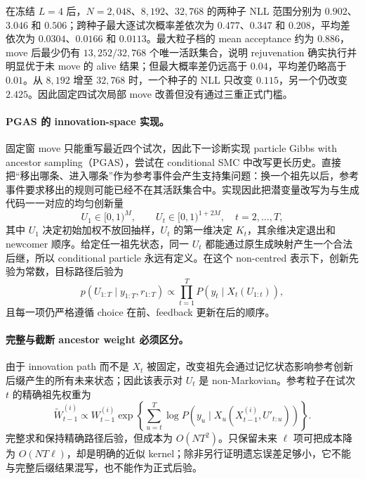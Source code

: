 在冻结 $L=4$ 后，$N=2{,}048$、$8{,}192$、$32{,}768$ 的两种子 NLL 范围分别为 $0.902$、$3.046$ 和 $0.506$；跨种子最大逐试次概率差依次为 $0.477$、$0.347$ 和 $0.208$，平均差依次为 $0.0304$、$0.0166$ 和 $0.0113$。最大粒子档的 mean acceptance 约为 $0.886$，move 后最少仍有 $13{,}252/32{,}768$ 个唯一活跃集合，说明 rejuvenation 确实执行并明显优于未 move 的 alive 结果；但最大概率差仍远高于 $0.04$，平均差仍略高于 $0.01$。从 $8{,}192$ 增至 $32{,}768$ 时，一个种子的 NLL 只改变 $0.115$，另一个仍改变 $2.425$。因此固定四试次局部 move 改善但没有通过三重正式门槛。

\paragraph{PGAS 的 innovation-space 实现。}
固定窗 move 只能重写最近四个试次，因此下一诊断实现 particle Gibbs with ancestor sampling（PGAS），尝试在 conditional SMC 中改写更长历史。直接把“移出哪条、进入哪条”作为参考事件会产生支持集问题：换一个祖先以后，参考事件要求移出的规则可能已经不在其活跃集合中。实现因此把潜变量改写为与生成代码一一对应的均匀创新量
\begin{equation}
 U_1\in[0,1)^M,
 \qquad
 U_t\in[0,1)^{1+2M},\quad t=2,\ldots,T,
 \label{eq:model0804-pgas-innovations}
\end{equation}
其中 $U_1$ 决定初始加权不放回抽样，$U_t$ 的第一维决定 $K_t$，其余维决定退出和 newcomer 顺序。给定任一祖先状态，同一 $U_t$ 都能通过原生成映射产生一个合法后继，所以 conditional particle 永远有定义。在这个 non-centred 表示下，创新先验为常数，目标路径后验为
\begin{equation}
 p(U_{1:T}\mid y_{1:T},r_{1:T})
 \propto
 \prod_{t=1}^T P(y_t\mid X_t(U_{1:t})),
 \label{eq:model0804-pgas-target}
\end{equation}
且每一项仍严格遵循 choice 在前、feedback 更新在后的顺序。

\paragraph{完整与截断 ancestor weight 必须区分。}
由于 innovation path 而不是 $X_t$ 被固定，改变祖先会通过记忆状态影响参考创新后缀产生的所有未来状态；因此该表示对 $U_t$ 是 non-Markovian。参考粒子在试次 $t$ 的精确祖先权重为
\begin{equation}
 \widetilde W^{(i)}_{t-1}
 \propto W^{(i)}_{t-1}
 \exp\left\{
   \sum_{u=t}^{T}
   \log P\left(y_u\mid
   X_u(X^{(i)}_{t-1},U'_{t:u})\right)
 \right\}.
 \label{eq:model0804-pgas-ancestor}
\end{equation}
完整求和保持精确路径后验，但成本为 $O(NT^2)$。只保留未来 $\ell$ 项可把成本降为 $O(NT\ell)$，却是明确的近似 kernel；除非另行证明遗忘误差足够小，它不能与完整后缀结果混写，也不能作为正式后验。

